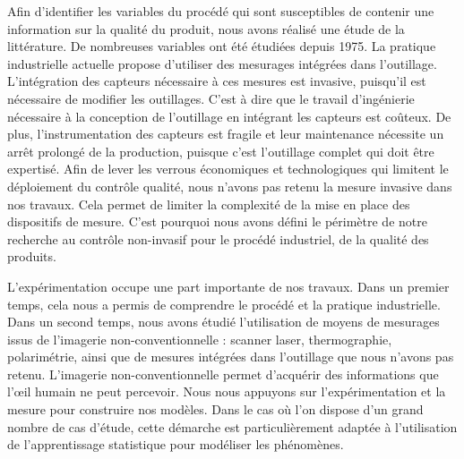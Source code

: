 \bigskip

Afin d'identifier les variables du procédé qui sont susceptibles de contenir une information sur la qualité du produit, nous avons réalisé une étude de la littérature.
De nombreuses variables ont été étudiées depuis 1975.
La pratique industrielle actuelle propose d'utiliser des mesurages intégrées dans l'outillage.
L'intégration des capteurs nécessaire à ces mesures est invasive, puisqu'il est nécessaire de modifier les outillages.
C'est à dire que le travail d'ingénierie nécessaire à la conception de l'outillage en intégrant les capteurs est coûteux.
De plus, l'instrumentation des capteurs est fragile et leur maintenance nécessite un arrêt prolongé de la production, puisque c'est l'outillage complet qui doit être expertisé.
Afin de lever les verrous économiques et technologiques qui limitent le déploiement du contrôle qualité, nous n'avons pas retenu la mesure invasive dans nos travaux.
Cela permet de limiter la complexité de la mise en place des dispositifs de mesure.
C'est pourquoi nous avons défini le périmètre de notre recherche au contrôle non-invasif pour le procédé industriel, de la qualité des produits.

L'expérimentation occupe une part importante de nos travaux.
Dans un premier temps, cela nous a permis de comprendre le procédé et la pratique industrielle.
Dans un second temps, nous avons étudié l'utilisation de moyens de mesurages issus de l'imagerie non-conventionnelle : scanner laser, thermographie, polarimétrie, ainsi que de mesures intégrées dans l'outillage que nous n'avons pas retenu.
L'imagerie non-conventionnelle permet d'acquérir des informations que l'œil humain ne peut percevoir. %
Nous nous appuyons sur l'expérimentation et la mesure pour construire nos modèles.  %
Dans le cas où l'on dispose d'un grand nombre de cas d'étude, cette démarche est particulièrement adaptée à l'utilisation de l'apprentissage statistique pour modéliser les phénomènes.

